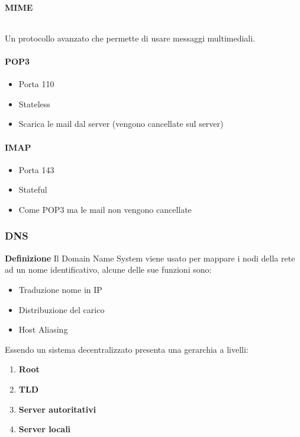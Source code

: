 \documentclass{article}
\begin{document}
\paragraph{MIME} $\ $\newline

\noindent Un protocollo avanzato che permette di usare messaggi multimediali.\newline

\paragraph{POP3}
\begin{itemize}
    \item Porta 110
    \item Stateless
    \item Scarica le mail dal server (vengono cancellate sul server)\newline
\end{itemize}

\paragraph{IMAP}
\begin{itemize}
    \item Porta 143
    \item Stateful
    \item Come POP3 ma le mail non vengono cancellate
\end{itemize}


\subsubsection{DNS}

\textbf{Definizione} Il Domain Name System viene usato per mappare i nodi della rete ad un nome identificativo, alcune delle sue funzioni sono:
\begin{itemize}
    \item Traduzione nome in IP
    \item Distribuzione del carico
    \item Host Aliasing\newline
\end{itemize}

\noindent Essendo un sistema decentralizzato presenta una gerarchia a livelli:
\begin{enumerate}
    \item \textbf{Root}
    \item \textbf{TLD}
    \item \textbf{Server autoritativi}
    \item \textbf{Server locali}\newline
\end{enumerate}
\end{document}

